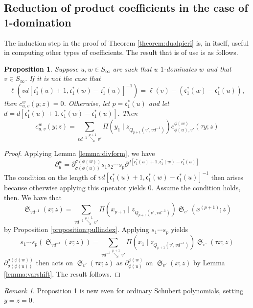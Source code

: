 \documentclass[reqno]{amsart}
\newtheorem{corollary}[lemma]{Corollary}
\newtheorem{proposition}[lemma]{Proposition}
\theoremstyle{definition}
\theoremstyle{remark}
\newtheorem*{remark}{Remark}
\numberwithin{equation}{subsection}
\DeclareMathOperator{\sch}{\mathfrak{S}}
\newcommand{\smpfu}{\mathsf{\Pi}}
\newcommand{\smpre}[2]{\ensuremath{}\smpfu\left( #1 \mid #2\right)}
\newcommand{\downvar}[1]{\stackrel{#1}{\searrow}}
\newcommand{\shifthom}{\tau}
\newcommand{\code}{\mathfrak{c}}
\begin{document}

\subsection{Reduction of product coefficients in the case of $1$-domination}

The induction step in the proof of Theorem \ref{theorem:dualpieri} is, in itself, useful in computing other types of coefficients. The result that is of use is as follows.

\begin{proposition} \label{proposition:oneshift}
	Suppose $u,w\in S_\infty$ are such that $u$ $1$-dominates $w$ and that $v\in S_\infty$. If it is not the case that $$\ell(vd[\code_1^*(u)+1,\code_1^*(w)-\code_1^*(u)]^{-1}) = \ell(v)-(\code_1^*(w) - \code_1^*(u)),$$
then $c_{u,v}^w(y;z)=0$. Otherwise, let $p=\code_1^*(u)$ and let $d=d[\code_1^*(u)+1,\code_1^*(w)-\code_1^*(u)]$. Then
	$$c_{u,v}^w(y;z)=\sum_{vd^{-1}\downvar{p+1}v'}\smpre{y_1}{z_{Q_{p+1}(v',vd^{-1})}}c_{\phi(u),v'}^{\phi(w)}(\shifthom y;z)$$
\end{proposition}
\begin{proof}
	Applying Lemma \ref{lemma:divform}, we have
	$$\partial_u^w=\partial_{\sigma(\phi(u))}^{\sigma(\phi(w))}s_1s_2\cdots s_p\partial^{d[\code_1^*(u)+1,\code_1^*(w)-\code_1^*(u)]}$$
	The condition on the length of $vd[\code_1^*(u)+1,\code_1^*(w)-\code_1^*(u)]^{-1}$ then arises because otherwise applying this operator yields $0$. Assume the condition holds, then. We have that
	$$\sch_{vd^{-1}}(x;z)=\sum_{vd^{-1}\downvar{p+1}v'}\smpre{x_{p+1}}{z_{Q_{p+1}(v',vd^{-1})}}\sch_{v'}(x^{(p+1)};z)$$
	by Proposition \ref{proposition:pullindex}. Applying $s_1\cdots s_p$ yields
	$$s_1\cdots s_p(\sch_{vd^{-1}}(x;z))=\sum_{vd^{-1}\downvar{p+1}v'}\smpre{x_1}{z_{Q_{p+1}(v',vd^{-1})}}\sch_{v'}(\shifthom x;z)$$
	$\partial_{\sigma(\phi(u))}^{\sigma(\phi(w))}$ then acts on $\sch_{v'}(\shifthom x;z)$ as $\partial_{\phi(u)}^{\phi(w)}$ on $\sch_{v'}(x;z)$ by Lemma \ref{lemma:varshift}. The result follows.
\end{proof}

\begin{remark}
	Proposition \ref{proposition:oneshift} is new even for ordinary Schubert polynomials, setting $y=z=0$.
\end{remark}
\end{document}
